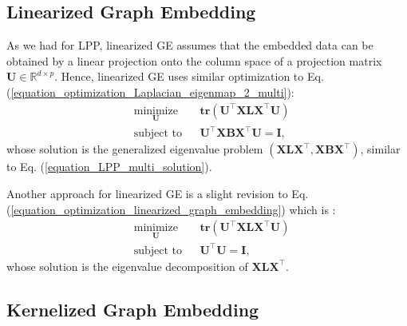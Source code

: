 \documentclass[lang=cn,10pt]{gorgeousnbook}
\numberwithin{equation}{section}%
\numberwithin{figure}{section}%
\begin{document}
\subsection{Linearized Graph Embedding}

As we had for LPP, linearized GE \cite{yan2005graph,yan2006graph} assumes that the embedded data can be obtained by a linear projection onto the column space of a projection matrix $\boldsymbol{U} \in \mathbb{R}^{d \times p}$. Hence, linearized GE uses similar optimization to Eq. (\ref{equation_optimization_Laplacian_eigenmap_2_multi}):
\begin{equation}\label{equation_optimization_linearized_graph_embedding}
\begin{aligned}
& \underset{\boldsymbol{U}}{\text{minimize}}
& & \textbf{tr}(\boldsymbol{U}^\top \boldsymbol{X} \boldsymbol{L} \boldsymbol{X}^\top \boldsymbol{U}) \\
& \text{subject to}
& & 
\boldsymbol{U}^\top \boldsymbol{X} \boldsymbol{B} \boldsymbol{X}^\top \boldsymbol{U} = \boldsymbol{I},
\end{aligned}
\end{equation}
whose solution is the generalized eigenvalue problem $(\boldsymbol{X} \boldsymbol{L} \boldsymbol{X}^\top, \boldsymbol{X} \boldsymbol{B} \boldsymbol{X}^\top)$, similar to Eq. (\ref{equation_LPP_multi_solution}).

Another approach for linearized GE is a slight revision to Eq. (\ref{equation_optimization_linearized_graph_embedding}) which is \cite{yan2005graph}:
\begin{equation}\label{equation_optimization_linearized_graph_embedding2}
\begin{aligned}
& \underset{\boldsymbol{U}}{\text{minimize}}
& & \textbf{tr}(\boldsymbol{U}^\top \boldsymbol{X} \boldsymbol{L} \boldsymbol{X}^\top \boldsymbol{U}) \\
& \text{subject to}
& & 
\boldsymbol{U}^\top \boldsymbol{U} = \boldsymbol{I},
\end{aligned}
\end{equation}
whose solution is the eigenvalue decomposition of $\boldsymbol{X} \boldsymbol{L} \boldsymbol{X}^\top$. 

\subsection{Kernelized Graph Embedding}
\end{document}
